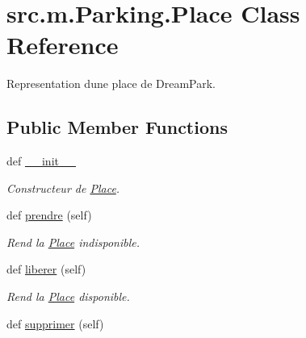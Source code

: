 \hypertarget{classsrc_1_1m_1_1_parking_1_1_place}{}\section{src.\+m.\+Parking.\+Place Class Reference}
\label{classsrc_1_1m_1_1_parking_1_1_place}


Representation d\textquotesingle{}une place de Dream\+Park.  


\subsection*{Public Member Functions}
\begin{DoxyCompactItemize}
\item 
def \hyperlink{classsrc_1_1m_1_1_parking_1_1_place_a7e633f5df0c70a72c431b70db19588a4}{\+\_\+\+\_\+init\+\_\+\+\_\+}
\begin{DoxyCompactList}\small\item\em Constructeur de \hyperlink{classsrc_1_1m_1_1_parking_1_1_place}{Place}. \end{DoxyCompactList}\item 
\hypertarget{classsrc_1_1m_1_1_parking_1_1_place_a69d8f3af2c69f93414fcf51ebaef3222}{}def \hyperlink{classsrc_1_1m_1_1_parking_1_1_place_a69d8f3af2c69f93414fcf51ebaef3222}{prendre} (self)\label{classsrc_1_1m_1_1_parking_1_1_place_a69d8f3af2c69f93414fcf51ebaef3222}

\begin{DoxyCompactList}\small\item\em Rend la \hyperlink{classsrc_1_1m_1_1_parking_1_1_place}{Place} indisponible. \end{DoxyCompactList}\item 
\hypertarget{classsrc_1_1m_1_1_parking_1_1_place_a2dc3678aa574bd07157378d29697ef69}{}def \hyperlink{classsrc_1_1m_1_1_parking_1_1_place_a2dc3678aa574bd07157378d29697ef69}{liberer} (self)\label{classsrc_1_1m_1_1_parking_1_1_place_a2dc3678aa574bd07157378d29697ef69}

\begin{DoxyCompactList}\small\item\em Rend la \hyperlink{classsrc_1_1m_1_1_parking_1_1_place}{Place} disponible. \end{DoxyCompactList}\item 
\hypertarget{classsrc_1_1m_1_1_parking_1_1_place_a462658ee0c37ce2ead2ad12d5b6921df}{}def \hyperlink{classsrc_1_1m_1_1_parking_1_1_place_a462658ee0c37ce2ead2ad12d5b6921df}{supprimer} (self)\label{classsrc_1_1m_1_1_parking_1_1_place_a462658ee0c37ce2ead2ad12d5b6921df}


\end{DoxyCompactItemize}
